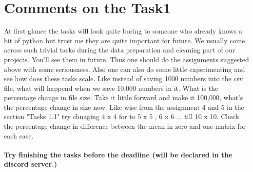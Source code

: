 \documentclass[a4paper]{article}
\begin{document}
\section{Comments on the Task1}
At first glance the tasks will look quite boring to someone who already knows a bit of python but trust me they are quite important for future. 
We usually come across such trivial tasks during the data preparation and cleaning part of our projects. You'll see them in future. Thus one should do the assignments suggested above with some seriousness. 
Also one can also do some little experimenting and see how does these tasks scale. Like instead of saving 1000 numbers into the csv file, what will happend when we save 10,000 numbers in it. What is the percentage change in file size. Take it little forward and make it 100,000, what's the percentage change in size now. 
Like wise from the assignment 4 and 5 in the section "Tasks 1.1" try chnaging 4 x 4 for to 5 x 5 , 6 x 6 ... till 10 x 10. Check the percentage change in difference between the mean in zero and one matrix for each case.
\\ \\
\textbf{ Try finishing the tasks before the deadline (will be declared in the discord server.) }
\end{document}
